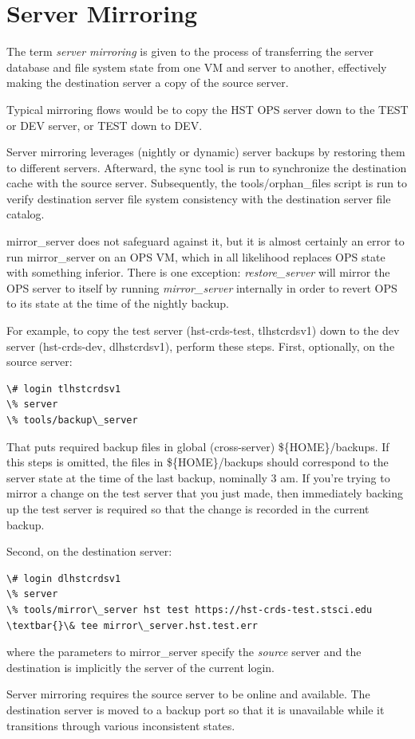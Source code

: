 \documentclass[letterpaper,10pt,english]{sphinxmanual}
\begin{document}
\section{Server Mirroring}
\label{server_guide:server-mirroring}
The term \emph{server mirroring} is given to the process of transferring the server database and file system state from one
VM and server to another,  effectively making the destination server a copy of the source server.

Typical mirroring flows would be to copy the HST OPS server down to the TEST or DEV server,  or TEST down to DEV.

Server mirroring leverages (nightly or dynamic) server backups by restoring them to different servers.  Afterward,
the sync tool is run to synchronize the destination cache with the source server.   Subsequently,  the tools/orphan\_files
script is run to verify destination server file system consistency with the destination server file catalog.

mirror\_server does not safeguard against it,  but it is almost certainly an error to run mirror\_server on an
OPS VM,  which in all likelihood replaces OPS state with something inferior.   There is one exception:  \emph{restore\_server}
will mirror the OPS server to itself by running \emph{mirror\_server} internally in order to revert OPS to its state at the
time of the nightly backup.

For example,  to copy the test server (hst-crds-test, tlhstcrdsv1) down to the dev server (hst-crds-dev, dlhstcrdsv1),
perform these steps.  First, optionally, on the source server:

\begin{Verbatim}[commandchars=\\\{\}]
\# login tlhstcrdsv1
\% server
\% tools/backup\_server
\end{Verbatim}

That puts required backup files in global (cross-server) \$\{HOME\}/backups.  If this steps is omitted,  the files in
\$\{HOME\}/backups should correspond to the server state at the time of the last backup,  nominally 3 am.  If you're trying
to mirror a change on the test server that you just made,  then immediately backing up the test server is required so
that the change is recorded in the current backup.

Second, on the destination server:

\begin{Verbatim}[commandchars=\\\{\}]
\# login dlhstcrdsv1
\% server
\% tools/mirror\_server hst test https://hst-crds-test.stsci.edu \textbar{}\& tee mirror\_server.hst.test.err
\end{Verbatim}

where the parameters to mirror\_server specify the \emph{source} server and the destination is implicitly the
server of the current login.

Server mirroring requires the source server to be online and available.   The destination server is moved
to a backup port so that it is unavailable while it transitions through various inconsistent states.



\renewcommand{\indexname}{Index}
\printindex
\end{document}
